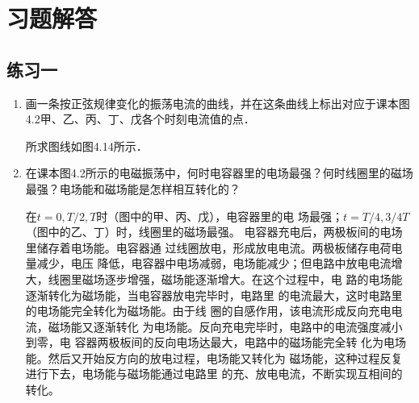 \section{习题解答}
\subsection{练习一}
\begin{enumerate}
	\item 画一条按正弦规律变化的振荡电流的曲线，并在这条曲线上标出对应于课本图4.2甲、乙、丙、丁、戊各个时刻电流值的点．

    \begin{solution}
        所求图线如图4.14所示．
\begin{figure}[htp]
    \centering
{}
    \caption{}
\end{figure}
    \end{solution}
    
	\item 在课本图4.2所示的电磁振荡中，何时电容器里的电场最强？何时线圈里的磁场最强？电场能和磁场能是怎样相互转化的？

    \begin{solution}
在$t=0, T/2, T$时（图中的甲、丙、戊），电容器里的电
场最强；$t=T/4, 3/4T$（图中的乙、丁）时，线圈里的磁场最强。
电容器充电后，两极板间的电场里储存着电场能。电容器通
过线圈放电，形成放电电流。两极板储存电荷电量减少，电压
降低，电容器中电场减弱，电场能减少；但电路中放电电流增
大，线圈里磁场逐步增强，磁场能逐渐增大。在这个过程中，电
路的电场能逐渐转化为磁场能，当电容器放电完毕时，电路里
的电流最大，这时电路里的电场能完全转化为磁场能。由于线
圈的自感作用，该电流形成反向充电电流，磁场能又逐渐转化
为电场能。反向充电完毕时，电路中的电流强度减小到零，电
容器两极板间的反向电场达最大，电路中的磁场能完全转
化为电场能。然后又开始反方向的放电过程，电场能又转化为
磁场能，这种过程反复进行下去，电场能与磁场能通过电路里
的充、放电电流，不断实现互相间的转化。
    \end{solution}
    

\end{enumerate}
